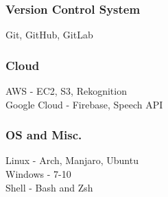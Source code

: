 \subsubsection*{Version Control System}
Git, GitHub, GitLab \\

\subsubsection*{Cloud}
AWS - {EC2, S3, Rekognition} \\
Google Cloud - Firebase, Speech API \\

\subsubsection*{OS and Misc.}
Linux - {Arch, Manjaro, Ubuntu} \\
Windows - {7-10} \\
Shell - {Bash and Zsh} \\

\sectionspace %
